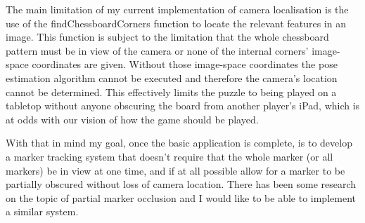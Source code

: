 \documentclass{article}
\begin{document}
The main limitation of my current implementation of camera localisation is the use of the findChessboardCorners function to locate the relevant features in an image. This function is subject to the limitation that the whole chessboard pattern must be in view of the camera or none of the internal corners' image-space coordinates are given. Without those image-space coordinates the pose estimation algorithm cannot be executed and therefore the camera's location cannot be determined. This effectively limits the puzzle to being played on a tabletop without anyone obscuring the board from another player's iPad, which is at odds with our vision of how the game should be played.

With that in mind my goal, once the basic application is complete, is to develop a marker tracking system that doesn't require that the whole marker (or all markers) be in view at one time, and if at all possible allow for a marker to be partially obscured without loss of camera location. There has been some research on the topic of partial marker occlusion \cite{occlusion} and I would like to be able to implement a similar system. 




\nocite{*}


\end{document}
